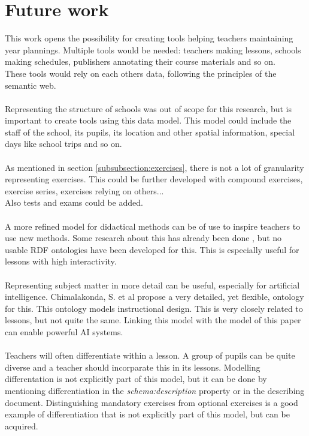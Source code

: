 \documentclass[a4paper]{report}
\begin{document}
    \chapter{Future work}

    This work opens the possibility for creating tools helping teachers maintaining year plannings.
    Multiple tools would be needed: teachers making lessons, schools making schedules, publishers annotating their course materials and so on.\\
    These tools would rely on each others data, following the principles of the semantic web.\\ \\
    Representing the structure of schools was out of scope for this research, but is important to create tools using this data model.
    This model could include the staff of the school, its pupils, its location and other spatial information, special days like school trips and so on.\\ \\
    As mentioned in section \ref{subsubsection:exercises}, there is not a lot of granularity representing exercises. This could be further developed with compound exercises, exercise series, exercises relying on others...\\
    Also tests and exams could be added.\\ \\
    A more refined model for didactical methods can be of use to inspire teachers to use new methods. Some research about this has already been done \cite{hierarchy}, but no usable RDF ontologies have been developed for this.
    This is especially useful for lessons with high interactivity.\\ \\
    Representing subject matter in more detail can be useful, especially for artificial intelligence. Chimalakonda, S. et al \cite{dida} propose a very detailed, yet flexible, ontology for this.
    This ontology models instructional design. This is very closely related to lessons, but not quite the same. Linking this model with the model of this paper can enable powerful AI systems.\\ \\
    Teachers will often differentiate within a lesson. A group of pupils can be quite diverse and a teacher should incorparate this in its lessons.
    Modelling differentation is not explicitly part of this model, but it can be done by mentioning differentiation in the \textit{schema:description} property or in the describing document. 
    Distinguishing mandatory exercises from optional exercises is a good example of differentiation that is not explicitly part of this model, but can be acquired. \\ \\




\appendix

\end{document}
